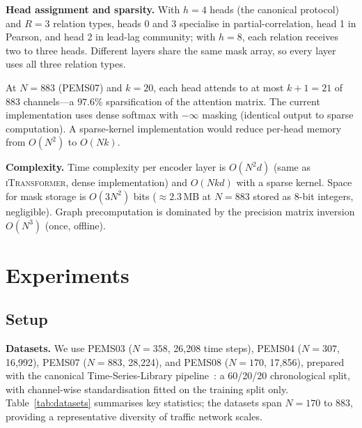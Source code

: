 \documentclass[letterpaper]{article}   %
\newcommand{\itrans}{\textsc{iTransformer}}
\begin{document}
\textbf{Head assignment and sparsity.}
With $h{=}4$ heads (the canonical protocol) and $R{=}3$ relation types,
heads 0 and 3 specialise in partial-correlation, head 1 in Pearson, and head 2
in lead-lag community; with $h{=}8$, each relation receives two to three heads.
Different layers share the same mask array, so every layer uses all three
relation types.

At $N{=}883$ (PEMS07) and $k{=}20$, each head attends to at most $k{+}1{=}21$
of 883 channels—a $97.6\%$ sparsification of the attention matrix.
The current implementation uses dense softmax with $-\infty$ masking
(identical output to sparse computation). A sparse-kernel implementation would
reduce per-head memory from $O(N^2)$ to $O(Nk)$.

\textbf{Complexity.}
Time complexity per encoder layer is $O(N^2 d)$ (same as \itrans{}, dense implementation)
and $O(Nkd)$ with a sparse kernel. Space for mask storage is $O(3N^2)$ bits
($\approx 2.3$\,MB at $N{=}883$ stored as 8-bit integers, negligible). Graph precomputation is dominated
by the precision matrix inversion $O(N^3)$ (once, offline).




\section{Experiments}
\label{sec:experiments}

\subsection{Setup}

\textbf{Datasets.}
We use PEMS03 ($N{=}358$, 26{,}208 time steps), PEMS04 ($N{=}307$, 16{,}992),
PEMS07 ($N{=}883$, 28{,}224), and PEMS08 ($N{=}170$, 17{,}856), prepared with the
canonical Time-Series-Library pipeline~\cite{wu2023timesnet}: a 60/20/20
chronological split, with channel-wise standardisation fitted on the training
split only.
Table~\ref{tab:datasets} summarises key statistics; the datasets span $N{=}170$
to $883$, providing a representative diversity of traffic network scales.
\end{document}
